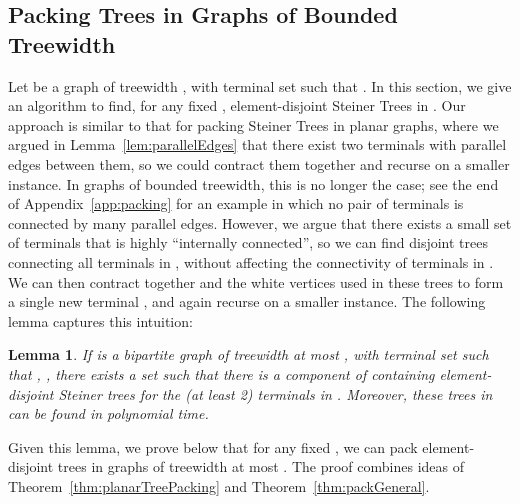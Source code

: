 \documentclass[11pt]{article}
\newtheorem{lemma}{Lemma}[section]
\begin{document}
\subsection{Packing Trees in Graphs of Bounded Treewidth}
\label{subsec:treewidth}

Let  be a graph of treewidth , with terminal set  such that . In this section, we give an
algorithm to find, for any fixed ,  element-disjoint
Steiner Trees in . Our approach is similar to that for packing
Steiner Trees in planar graphs, where we argued in
Lemma~\ref{lem:parallelEdges} that there exist two terminals  with  parallel edges between them, so we could
contract them together and recurse on a smaller instance. In graphs of
bounded treewidth, this is no longer the case; see the end of
Appendix~\ref{app:packing} for an example in which no pair of
terminals is connected by many parallel edges.  However, we argue that
there exists a small set of terminals  that is highly
``internally connected'', so we can find  disjoint trees
connecting all terminals in , without affecting the connectivity
of terminals in . We can then contract together  and the
white vertices used in these trees to form a single new terminal ,
and again recurse on a smaller instance. The following lemma captures
this intuition:

\begin{lemma}\label{lem:treewidthSeparator}
  If  is a bipartite graph of treewidth at most , with
  terminal set  such that , , there exists a set  such that there is a
  component  of  containing 
  element-disjoint Steiner trees for the (at least 2) terminals in
  . Moreover, these trees in  can be found in polynomial time.
\end{lemma}

Given this lemma, we prove below that for any fixed , we can pack
 element-disjoint trees in graphs of treewidth at most
. The proof combines ideas of Theorem~\ref{thm:planarTreePacking}
and Theorem~\ref{thm:packGeneral}.
\end{document}

